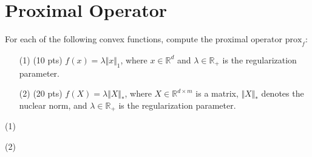 \section{Proximal Operator}
    For each of the following convex functions, compute the proximal operator $\text{prox}_{f}$:
\begin{itemize}
    \item[(1)] {\color{red} (10 pts)}  $f({x}) = \lambda\Vert {x }\Vert_{1}$, where ${x}\in\mathbb{R}^{d}$ and $\lambda \in \mathbb{R}_{+}$ is the regularization parameter.

    \item[(2)] {\color{red} (20 pts)} $f({X}) = \lambda \Vert {X}\Vert_{*}$, where ${X}\in \mathbb{R}^{d\times m}$ is a matrix, $\Vert {X}\Vert_{*}$ denotes the nuclear norm, and $\lambda\in \mathbb{R}_{+}$ is the regularization parameter.
\end{itemize}

\solution{}
(1)





(2)




\newpage
